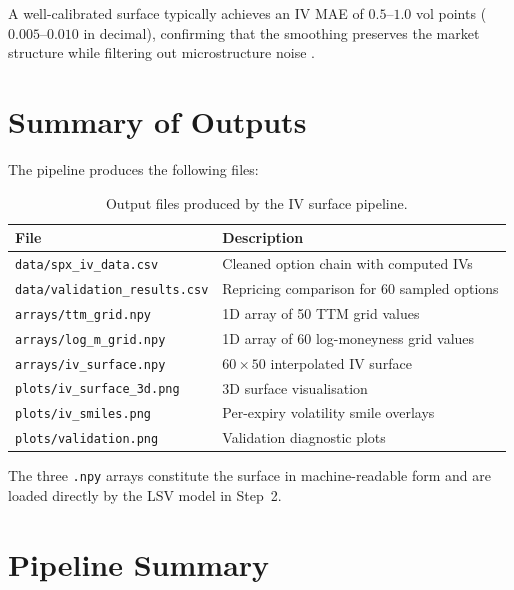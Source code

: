\documentclass[12pt, a4paper]{article}
\begin{document}
A well-calibrated surface typically achieves an IV MAE of $0.5$--$1.0$ vol
points ($0.005$--$0.010$ in decimal), confirming that the smoothing preserves
the market structure while filtering out microstructure noise
\parencite{gatheral2006volatility}.

\section{Summary of Outputs}
\label{sec:outputs}

The pipeline produces the following files:

\begin{table}[h]
\centering
\begin{tabular}{@{}lp{8.5cm}@{}}
\toprule
\textbf{File} & \textbf{Description} \\
\midrule
\texttt{data/spx\_iv\_data.csv}        & Cleaned option chain with computed IVs \\
\texttt{data/validation\_results.csv}  & Repricing comparison for 60 sampled options \\
\texttt{arrays/ttm\_grid.npy}          & 1D array of 50 TTM grid values \\
\texttt{arrays/log\_m\_grid.npy}       & 1D array of 60 log-moneyness grid values \\
\texttt{arrays/iv\_surface.npy}        & $60 \times 50$ interpolated IV surface \\
\texttt{plots/iv\_surface\_3d.png}     & 3D surface visualisation \\
\texttt{plots/iv\_smiles.png}          & Per-expiry volatility smile overlays \\
\texttt{plots/validation.png}          & Validation diagnostic plots \\
\bottomrule
\end{tabular}
\caption{Output files produced by the IV surface pipeline.}
\label{tab:outputs}
\end{table}

The three \texttt{.npy} arrays constitute the surface in machine-readable form
and are loaded directly by the LSV model in Step~2.

\section{Pipeline Summary}
\label{sec:pipeline}
\end{document}
